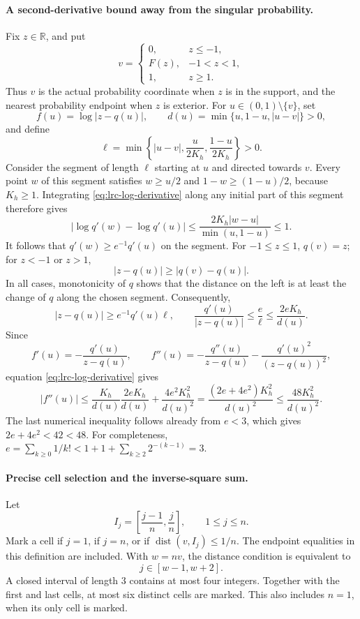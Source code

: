 \documentclass[11pt,a4paper]{article}
\begin{document}
\paragraph{A second-derivative bound away from the singular probability.}
Fix $z\in\mathbb R$, and put
\[
 v=\begin{cases}
 0,&z\leq-1,\\
 F(z),&-1<z<1,\\
 1,&z\geq1.
 \end{cases}
\]
Thus $v$ is the actual probability coordinate when $z$ is in the
support, and the nearest probability endpoint when $z$ is exterior.
For $u\in(0,1)\setminus\{v\}$, set
\[
 f(u)=\log|z-q(u)|,\qquad
 d(u)=\min\{u,1-u,|u-v|\}>0,
\]
and define
\[
 \ell=\min\left\{|u-v|,\frac{u}{2K_h},
                              \frac{1-u}{2K_h}\right\}>0.
\]
Consider the segment of length $\ell$ starting at $u$ and directed
towards $v$. Every point $w$ of this segment satisfies
$w\geq u/2$ and $1-w\geq(1-u)/2$, because $K_h\geq1$.
Integrating \eqref{eq:lrc-log-derivative} along any initial part of
this segment therefore gives
\[
 |\log q'(w)-\log q'(u)|
 \leq\frac{2K_h|w-u|}{\min(u,1-u)}\leq1.
\]
It follows that $q'(w)\geq e^{-1}q'(u)$ on the segment.
For $-1\leq z\leq1$, $q(v)=z$; for $z<-1$ or $z>1$,
\[
 |z-q(u)|\geq|q(v)-q(u)|.
\]
In all cases, monotonicity of $q$ shows that the distance on the
left is at least the change of $q$ along the chosen segment.
Consequently,
\[
 |z-q(u)|\geq e^{-1}q'(u)\ell,
 \qquad
 \frac{q'(u)}{|z-q(u)|}
 \leq\frac e\ell
 \leq\frac{2eK_h}{d(u)}.
\]
Since
\[
 f'(u)=-\frac{q'(u)}{z-q(u)},\qquad
 f''(u)=-\frac{q''(u)}{z-q(u)}
        -\frac{q'(u)^2}{(z-q(u))^2},
\]
equation \eqref{eq:lrc-log-derivative} gives
\[
 |f''(u)|
 \leq\frac{K_h}{d(u)}\frac{2eK_h}{d(u)}
       +\frac{4e^2K_h^2}{d(u)^2}
 =\frac{(2e+4e^2)K_h^2}{d(u)^2}
 \leq\frac{48K_h^2}{d(u)^2}.
\]
The last numerical inequality follows already from $e<3$, which
gives $2e+4e^2<42<48$. For completeness,
$e=\sum_{k\geq0}1/k!<1+1+\sum_{k\geq2}2^{-(k-1)}=3$.

\paragraph{Precise cell selection and the inverse-square sum.}
Let
\[
 I_j=\left[\frac{j-1}{n},\frac jn\right],\qquad1\leq j\leq n.
\]
Mark a cell if $j=1$, if $j=n$, or if
$\operatorname{dist}(v,I_j)\leq1/n$. The endpoint equalities in
this definition are included. With $w=nv$, the distance condition is
equivalent to
\[
 j\in[w-1,w+2].
\]
A closed interval of length $3$ contains at most four integers.
Together with the first and last cells, at most six distinct cells
are marked. This also includes $n=1$, when its only cell is marked.
\end{document}
